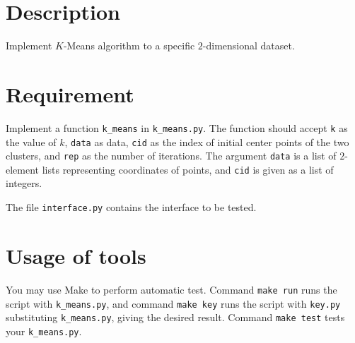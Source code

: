 \documentclass[english, nochinese]{../../TeXTemplate/pkupaper}
\title{\titlemark}
\author{pppppass}
\date{January 22, 2018}
\begin{document}
\maketitle

\section{Description}

Implement $K$-Means algorithm to a specific $2$-dimensional dataset.

\section{Requirement}

Implement a function \verb"k_means" in \verb"k_means.py". The function should accept \verb"k" as the value of $k$, \verb"data" as data, \verb"cid" as the index of initial center points of the two clusters, and \verb"rep" as the number of iterations. The argument \verb"data" is a list of $2$-element lists representing coordinates of points, and \verb"cid" is given as a list of integers.

The file \verb"interface.py" contains the interface to be tested.

\section{Usage of tools}

You may use Make to perform automatic test. Command \verb"make run" runs the script with \verb"k_means.py", and command \verb"make key" runs the script with \verb"key.py" substituting \verb"k_means.py", giving the desired result. Command \verb"make test" tests your \verb"k_means.py".
\end{document}
